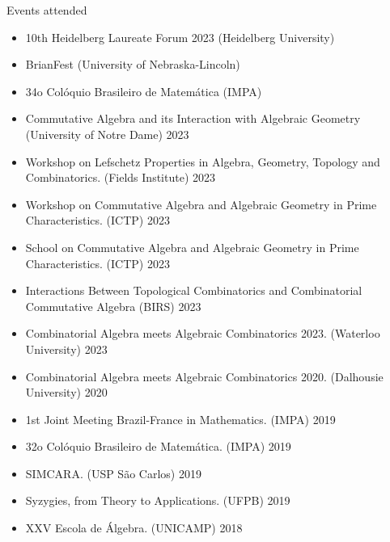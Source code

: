 \documentclass{resume} %
\begin{document}
\begin{rSection}{Events attended}

    \begin{itemize}[label={}]
        \item 10th Heidelberg Laureate Forum 2023 (Heidelberg University)
        \item BrianFest (University of Nebraska-Lincoln)
        \item 34o Colóquio Brasileiro de Matemática (IMPA)
        \item Commutative Algebra and its Interaction with Algebraic Geometry (University of Notre Dame) 2023
        \item Workshop on Lefschetz Properties in Algebra, Geometry, Topology and Combinatorics. (Fields Institute) 2023
        \item Workshop on Commutative Algebra and Algebraic Geometry in Prime Characteristics. (ICTP) 2023
        \item School on Commutative Algebra and Algebraic Geometry in Prime Characteristics. (ICTP) 2023
        \item Interactions Between Topological Combinatorics and Combinatorial Commutative Algebra (BIRS) 2023
        \item Combinatorial Algebra meets Algebraic Combinatorics 2023. (Waterloo University) 2023
        \item Combinatorial Algebra meets Algebraic Combinatorics 2020. (Dalhousie University) 2020
        \item 1st Joint Meeting Brazil-France in Mathematics. (IMPA) 2019
        \item 32o Colóquio Brasileiro de Matemática. (IMPA) 2019
        \item SIMCARA. (USP São Carlos) 2019
        \item Syzygies, from Theory to Applications. (UFPB) 2019
        \item XXV Escola de Álgebra. (UNICAMP) 2018
    \end{itemize}

\end{rSection}
\end{document}
